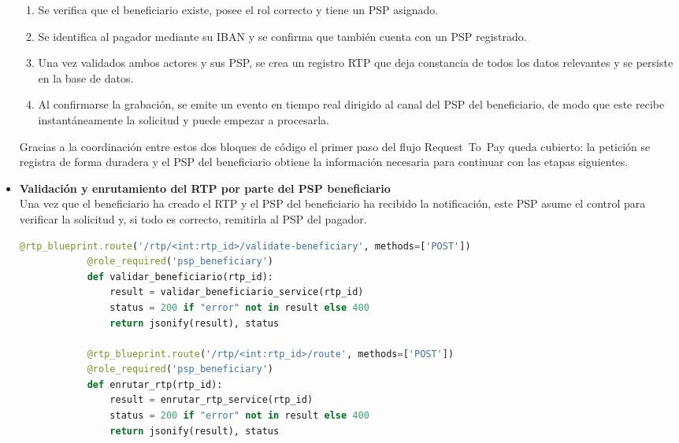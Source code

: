\begin{itemize}
        \begin{enumerate}
          \item Se verifica que el beneficiario existe, posee el rol correcto
                y tiene un PSP asignado.  
          \item Se identifica al pagador mediante su IBAN y se confirma que
                también cuenta con un PSP registrado.  
          \item Una vez validados ambos actores y sus PSP, se crea un registro
                RTP que deja constancia de todos los datos relevantes y se
                persiste en la base de datos.  
          \item Al confirmarse la grabación, se emite un evento en tiempo real
                dirigido al canal del PSP del beneficiario, de modo que este
                recibe instantáneamente la solicitud y puede empezar a
                procesarla.
        \end{enumerate}
        \bigskip

        Gracias a la coordinación entre estos dos bloques de código el primer
        paso del flujo Request~To~Pay queda cubierto: la petición se registra
        de forma duradera y el PSP del beneficiario obtiene la información
        necesaria para continuar con las etapas siguientes.

    \item \textbf{Validación y enrutamiento del RTP por parte del PSP beneficiario}\\[6pt]
        Una vez que el beneficiario ha creado el RTP y el PSP del beneficiario ha
        recibido la notificación, este PSP asume el control para verificar la
        solicitud y, si todo es correcto, remitirla al PSP del pagador.
        \vspace{0.6em}

       \begin{lstlisting}[language=Python, style=custom]
            @rtp_blueprint.route('/rtp/<int:rtp_id>/validate-beneficiary', methods=['POST'])
            @role_required('psp_beneficiary')
            def validar_beneficiario(rtp_id):
                result = validar_beneficiario_service(rtp_id)
                status = 200 if "error" not in result else 400
                return jsonify(result), status

            @rtp_blueprint.route('/rtp/<int:rtp_id>/route', methods=['POST'])
            @role_required('psp_beneficiary')
            def enrutar_rtp(rtp_id):
                result = enrutar_rtp_service(rtp_id)
                status = 200 if "error" not in result else 400
                return jsonify(result), status
        \end{lstlisting}


\end{itemize}
